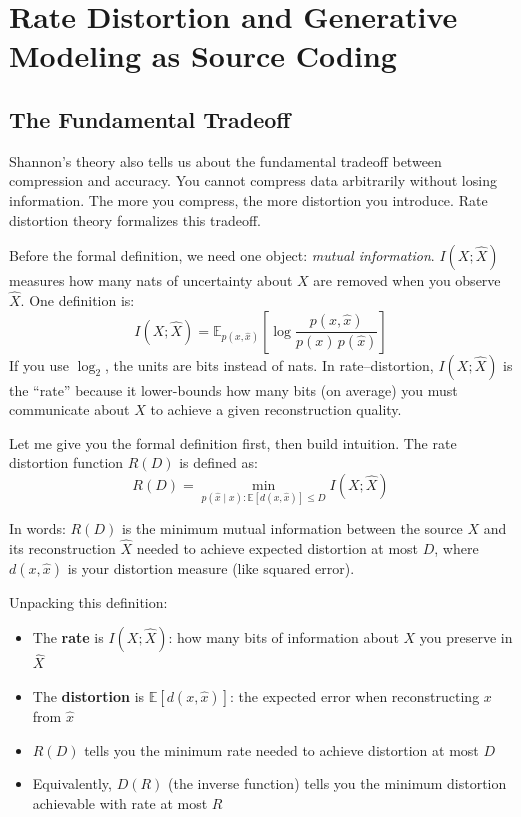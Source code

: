 \vspace{2em}

\section{Rate Distortion and Generative Modeling as Source Coding}

\subsection{The Fundamental Tradeoff}

Shannon's theory also tells us about the fundamental tradeoff between compression and accuracy. You cannot compress data arbitrarily without losing information. The more you compress, the more distortion you introduce. Rate distortion theory formalizes this tradeoff.

Before the formal definition, we need one object: \emph{mutual information}. $I(X;\hat{X})$ measures how many nats of uncertainty about $X$ are removed when you observe $\hat{X}$. One definition is:
\begin{equation}
I(X;\hat{X}) = \mathbb{E}_{p(x,\hat{x})}\left[\log\frac{p(x,\hat{x})}{p(x)\,p(\hat{x})}\right]
\end{equation}
If you use $\log_2$, the units are bits instead of nats. In rate--distortion, $I(X;\hat{X})$ is the ``rate'' because it lower-bounds how many bits (on average) you must communicate about $X$ to achieve a given reconstruction quality.

Let me give you the formal definition first, then build intuition. The rate distortion function $R(D)$ is defined as:
\begin{equation}
R(D) = \min_{p(\hat{x} \mid x): \mathbb{E}[d(x, \hat{x})] \leq D} I(X; \hat{X})
\end{equation}

In words: $R(D)$ is the minimum mutual information between the source $X$ and its reconstruction $\hat{X}$ needed to achieve expected distortion at most $D$, where $d(x, \hat{x})$ is your distortion measure (like squared error).

Unpacking this definition:

\begin{itemize}
\item The \textbf{rate} is $I(X; \hat{X})$: how many bits of information about $X$ you preserve in $\hat{X}$
\item The \textbf{distortion} is $\mathbb{E}[d(x, \hat{x})]$: the expected error when reconstructing $x$ from $\hat{x}$
\item $R(D)$ tells you the minimum rate needed to achieve distortion at most $D$
\item Equivalently, $D(R)$ (the inverse function) tells you the minimum distortion achievable with rate at most $R$
\end{itemize}


